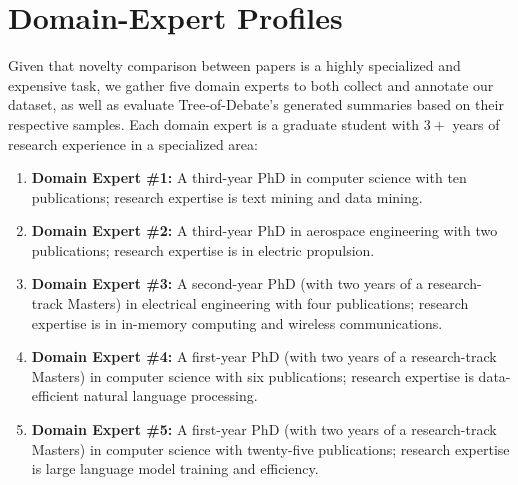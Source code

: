 \section{Domain-Expert Profiles}
\label{appendix: annotators}
\par Given that novelty comparison between papers is a highly specialized and expensive task, we gather five domain experts to both collect and annotate our dataset, as well as evaluate Tree-of-Debate's generated summaries based on their respective samples. Each domain expert is a graduate student with $3+$ years of research experience in a specialized area:
\begin{enumerate}
    \item \textbf{Domain Expert \#1:} A third-year PhD in computer science with ten publications; research expertise is text mining and data mining.
    \item \textbf{Domain Expert \#2:} A third-year PhD in aerospace engineering with two publications; research expertise is in electric propulsion.
    \item \textbf{Domain Expert \#3:} A second-year PhD (with two years of a research-track Masters) in electrical engineering with four publications; research expertise is in in-memory computing and wireless communications.
    \item \textbf{Domain Expert \#4:} A first-year PhD (with two years of a research-track Masters) in computer science with six publications; research expertise is data-efficient natural language processing.
    \item \textbf{Domain Expert \#5:} A first-year PhD (with two years of a research-track Masters) in computer science with twenty-five publications; research expertise is large language model training and efficiency.




\end{enumerate}